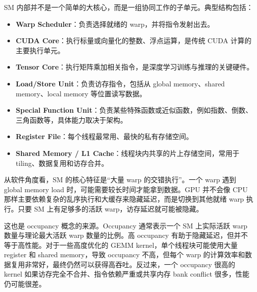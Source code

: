 SM 内部并不是一个简单的大核心，而是一组协同工作的子单元。典型结构包括：

\begin{itemize}
  \item \textbf{Warp Scheduler}：负责选择就绪的 warp，并将指令发射出去。
  \item \textbf{CUDA Core}：执行标量或向量化的整数、浮点运算，是传统 CUDA 计算的主要执行单元。
  \item \textbf{Tensor Core}：执行矩阵乘加相关指令，是深度学习训练与推理的关键硬件。
  \item \textbf{Load/Store Unit}：负责访存指令，包括从 global memory、shared memory、local memory 等位置读写数据。
  \item \textbf{Special Function Unit}：负责某些特殊函数或近似函数，例如指数、倒数、三角函数等，具体能力取决于架构。
  \item \textbf{Register File}：每个线程最常用、最快的私有存储空间。
  \item \textbf{Shared Memory / L1 Cache}：线程块内共享的片上存储空间，常用于 tiling、数据复用和访存合并。
\end{itemize}

从软件角度看，SM 的核心特征是“大量 warp 的交错执行”。一个 warp 遇到 global memory load 时，可能需要较长时间才能拿到数据。GPU 并不会像 CPU 那样主要依赖复杂的乱序执行和大缓存来隐藏延迟，而是切换到其他就绪 warp 执行。只要 SM 上有足够多的活跃 warp，访存延迟就可能被隐藏。

这也是 occupancy 概念的来源。Occupancy 通常表示一个 SM 上实际活跃 warp 数量与理论最大活跃 warp 数量的比例。高 occupancy 有助于隐藏延迟，但并不等于高性能。对于一些高度优化的 GEMM kernel，单个线程块可能使用大量 register 和 shared memory，导致 occupancy 不高，但每个 warp 的计算效率和数据复用非常好，最终仍然可以获得高吞吐。反过来，一个 occupancy 很高的 kernel 如果访存完全不合并、指令依赖严重或共享内存 bank conflict 很多，性能仍可能很差。

